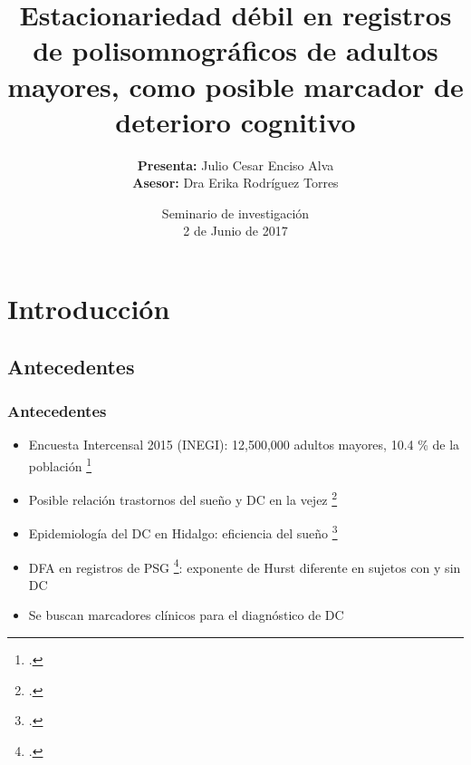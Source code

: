 \documentclass{beamer}
\title[Estacionariedad en PSG de adultos mayores]
{Estacionariedad d\'ebil en registros de polisomnogr\'aficos de adultos mayores, como posible 
marcador de deterioro cognitivo}
\author[Enciso Alva]
{
\textbf{Presenta:} Julio Cesar Enciso Alva\\
\textbf{Asesor:} Dra Erika Rodr\'iguez Torres}
\institute[LIMA]
{\large {Licenciatura en Matem\'aticas Aplicadas}}
\date[Junio 2017]
{Seminario de investigaci\'on\\ 2 de Junio de 2017}
\begin{document}
\frame{\titlepage}



\section{Introducci\'on}


\subsection{Antecedentes}

\begin{frame}\frametitle{Antecedentes}
\begin{itemize}
\item Encuesta Intercensal 2015 (INEGI): 12,500,000 adultos mayores, 10.4 \%  de la 
poblaci\'on \footcite{Intercensal15}

\item Posible relaci\'on trastornos del sue\~no y DC en la vejez \footcite{Miyata13}

\item Epidemiolog\'ia del DC en Hidalgo: eficiencia del sue\~no \footcite{VazquezTagle16}

\item DFA en registros de PSG \footcite{Valeria}: 
exponente de Hurst diferente en sujetos con y sin DC 

\item Se buscan marcadores cl\'inicos para el diagn\'ostico de DC
\end{itemize}
\end{frame}


\end{document}
